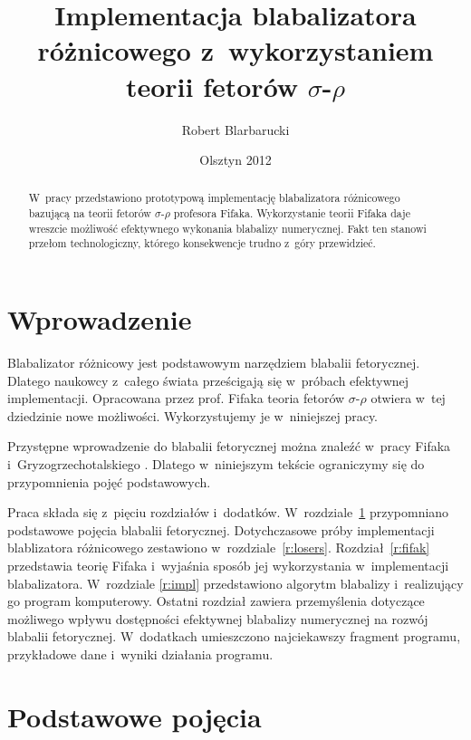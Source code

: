 \documentclass{wmiibook}
\author{Robert Blarbarucki}
\title{Implementacja blabalizatora różnicowego z~wykorzystaniem teorii fetorów
  $\sigma$-$\rho$}
\date{Olsztyn 2012}
\begin{document}
\maketitle

\begin{abstract}
W~pracy przedstawiono prototypową implementację blabalizatora różnicowego
bazującą na teorii fetorów $\sigma$-$\rho$ profesora Fifaka.  Wykorzystanie
teorii Fifaka daje wreszcie możliwość efektywnego wykonania blabalizy
numerycznej.  Fakt ten stanowi przełom technologiczny, którego konsekwencje
trudno z~góry przewidzieć.
\end{abstract}

\tableofcontents

\chapter*{Wprowadzenie}

Blabalizator różnicowy jest podstawowym narzędziem blabalii fetorycznej.
Dlatego naukowcy z~całego świata prześcigają się w~próbach efektywnej
implementacji.  Opracowana przez prof. Fifaka teoria fetorów $\sigma$-$\rho$
otwiera w~tej dziedzinie nowe możliwości.  Wykorzystujemy je w~niniejszej pracy.

Przystępne wprowadzenie do blabalii fetorycznej można znaleźć w~pracy Fifaka
i~Gryzogrzechotalskiego \cite{ffgg}.  Dlatego w~niniejszym tekście ograniczymy
się do przypomnienia pojęć podstawowych.

Praca składa się z~pięciu rozdziałów i~dodatków.  W~rozdziale~\ref{r:pojecia}
przypomniano podstawowe pojęcia blabalii fetorycznej.  Dotychczasowe próby
implementacji blablizatora różnicowego zestawiono w~rozdziale~\ref{r:losers}.
Rozdział~\ref{r:fifak} przedstawia teorię Fifaka i~wyjaśnia sposób jej
wykorzystania w~implementacji blabalizatora.  W~rozdziale \ref{r:impl}
przedstawiono algorytm blabalizy i~realizujący go program komputerowy.  Ostatni
rozdział zawiera przemyślenia dotyczące możliwego wpływu dostępności efektywnej
blabalizy numerycznej na rozwój blabalii fetorycznej.  W~dodatkach umieszczono
najciekawszy fragment programu, przykładowe dane i~wyniki działania programu.

\chapter{Podstawowe pojęcia}\label{r:pojecia}
\end{document}
